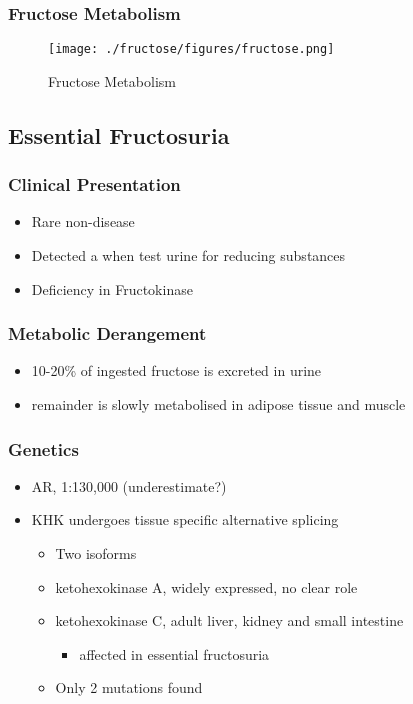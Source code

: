 \documentclass{scrartcl}
\begin{document}
\subsubsection{Fructose Metabolism}
\label{sec:orgf193d90}
\begin{figure}[htbp]
\centering
\texttt{[image: ./fructose/figures/fructose.png]}
\caption[Fructose]{\label{fig:org47b132d}
Fructose Metabolism}
\end{figure}
\subsection{Essential Fructosuria}
\label{sec:org737a28b}
\subsubsection{Clinical Presentation}
\label{sec:orgf7d260f}
\begin{itemize}
\item Rare non-disease
\item Detected a when test urine for reducing substances
\item Deficiency in Fructokinase
\end{itemize}
\subsubsection{Metabolic Derangement}
\label{sec:orgc9989cd}
\begin{itemize}
\item 10-20\% of ingested fructose is excreted in urine
\item remainder is slowly metabolised in adipose tissue and muscle
\end{itemize}
\subsubsection{Genetics}
\label{sec:orgd97ae67}
\begin{itemize}
\item AR, 1:130,000 (underestimate?)
\item KHK undergoes tissue specific alternative splicing
\begin{itemize}
\item Two isoforms
\item ketohexokinase A, widely expressed, no clear role
\item ketohexokinase C, adult liver, kidney and small intestine
\begin{itemize}
\item affected in essential fructosuria
\end{itemize}
\item Only 2 mutations found
\end{itemize}
\end{itemize}
\end{document}
